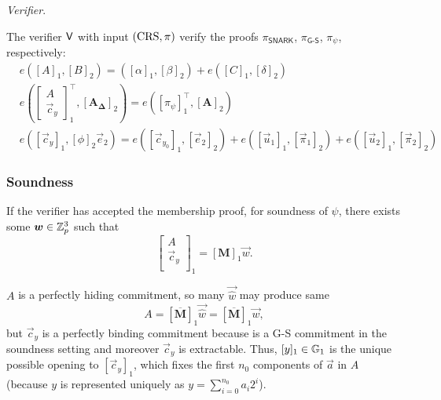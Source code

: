 \noindent \textit{Verifier}. 

The verifier $\mathsf{V}$ with input $(\textnormal{CRS},\pi)$ verify the proofs $\pi_{\textsf{SNARK}}$, $\pi_{\textsf{G-S}}$, $\pi_{\psi}$, respectively:
\[\begin{split}
&e\left(\left[A\right]_1,\left[B\right]_2\right)=\left([\alpha]_1,[\beta]_2\right)+e\left([C]_1,[\delta]_2\right)\\
&e\left(\left[\begin{array}{c}
A\\
\vec{c}_y
\end{array}\right]_1^{\top},\left[\mathbf{A}_{\mathbf{\Delta}}\right]_2\right)=e\left(\left[\pi_{\psi}\right]_1^{\top},\left[\mathbf{A}\right]_2\right)\\
&e([\vec{c}_y]_1,[\phi]_2\vec{e}_2)= e([\vec{c}_{y_0}]_1,[\vec{e}_2]_2)+e([\vec{u}_1]_1,[\vec{\pi}_1]_2)+e([\vec{u}_2]_1,[\vec{\pi}_2]_2)
\end{split}\]

\subsubsection*{Soundness}

If the verifier has accepted the membership proof, for soundness of $\psi$, there exists some $\vec{w} \in \Z_p^3$ such that
$$\left[\begin{array}{c}
A\\
\vec{c}_y\\
\end{array}\right]_1 = \left[\mathbf{M}\right]_1 \vec{w}.$$

$A$ is a perfectly hiding commitment, so many $\vec{\hat{w}}$ may produce same 
$$A=\left[\overline{\mathbf{M}}\right]_1\vec{\hat{w}}=\left[\overline{\mathbf{M}}\right]_1\vec{w},$$
 but $\vec{c}_y$ is a perfectly binding commitment because is a G-S commitment in the soundness setting and moreover $\vec{c}_y$ is extractable. Thus, $[y]_1 \in \mathbb{G}_1$ is the unique possible opening to $[\vec{c}_y]_1$, which fixes the first $n_0$ components of $\vec{a}$ in $A$ (because $y$ is represented uniquely as $y=\sum_{i=0}^{n_0} a_i 2^i$).

